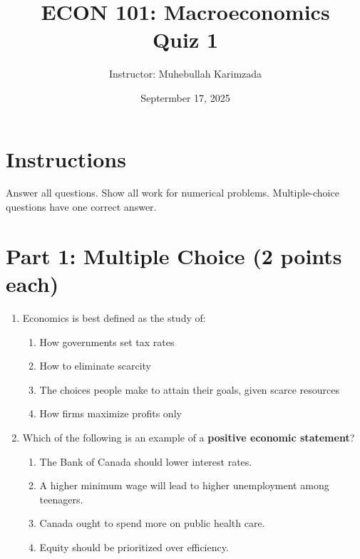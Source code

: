 \documentclass[12pt]{article}
\title{ECON 101: Macroeconomics \\ Quiz 1}
\author{Instructor: Muhebullah Karimzada}
\date{Septermber 17, 2025}
\begin{document}
\maketitle

\section*{Instructions}
Answer all questions. Show all work for numerical problems. Multiple-choice questions have one correct answer.

\section*{Part 1: Multiple Choice (2 points each)}

\begin{enumerate}
    \item Economics is best defined as the study of:
    \begin{enumerate}[label=\Alph*.]
        \item How governments set tax rates  
        \item How to eliminate scarcity  
        \item The choices people make to attain their goals, given scarce resources  
        \item How firms maximize profits only  
    \end{enumerate}

    \item Which of the following is an example of a \textbf{positive economic statement}?  
    \begin{enumerate}[label=\Alph*.]
        \item The Bank of Canada should lower interest rates.  
        \item A higher minimum wage will lead to higher unemployment among teenagers.  
        \item Canada ought to spend more on public health care.  
        \item Equity should be prioritized over efficiency.  
    \end{enumerate}


\end{enumerate}
\end{document}
